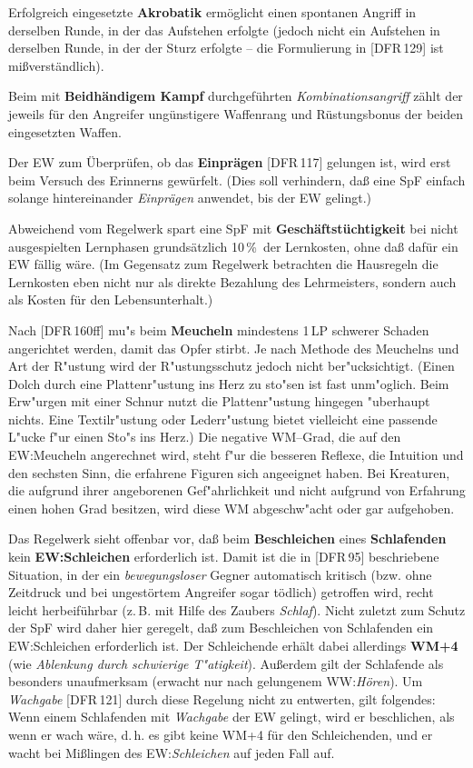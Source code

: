 \documentclass[10pt,a4paper,germanpar]{article}
\begin{document}
Erfolgreich eingesetzte \textbf{Akrobatik} ermöglicht einen spontanen
Angriff in derselben Runde, in der das Aufstehen erfolgte (jedoch
nicht ein Aufstehen in derselben Runde, in der der Sturz erfolgte --
die Formulierung in [DFR\,129] ist mißverständlich).

Beim mit \textbf{Beidhändigem Kampf} durchgeführten
\emph{Kombinationsangriff} zählt der jeweils für den Angreifer
ungünstigere Waffenrang und Rüstungsbonus der beiden eingesetzten
Waffen.

Der EW zum Überprüfen, ob das \textbf{Einprägen} [DFR\,117] gelungen
ist, wird erst beim Versuch des Erinnerns gewürfelt. (Dies soll
verhindern, daß eine SpF einfach solange hintereinander
\emph{Einprägen} anwendet, bis der EW gelingt.)

Abweichend vom Regelwerk spart eine SpF mit
\textbf{Geschäftstüchtigkeit} bei nicht ausgespielten Lernphasen
grund\-sätz\-lich 10\,\%\ der Lernkosten, ohne daß dafür ein EW fällig
wäre. (Im Gegensatz zum Regelwerk betrachten die Hausregeln die
Lernkosten eben nicht nur als direkte Bezahlung des Lehrmeisters,
sondern auch als Kosten für den Lebensunterhalt.)

Nach [DFR\,160ff] mu"s beim \textbf{Meucheln} mindestens 1\,LP
schwerer Schaden angerichtet werden, damit das Opfer stirbt. Je nach
Methode des Meuchelns und Art der R"ustung wird der R"ustungsschutz
jedoch nicht ber"ucksichtigt. (Einen Dolch durch eine Plattenr"ustung
ins Herz zu sto"sen ist fast unm"oglich. Beim Erw"urgen mit einer
Schnur nutzt die Plattenr"ustung hingegen "uberhaupt nichts. Eine
Textilr"ustung oder Lederr"ustung bietet vielleicht eine passende
L"ucke f"ur einen Sto"s ins Herz.) Die negative WM--Grad, die auf den
EW:Meucheln angerechnet wird, steht f"ur die besseren Reflexe, die
Intuition und den sechsten Sinn, die erfahrene Figuren sich angeeignet
haben. Bei Kreaturen, die aufgrund ihrer angeborenen Gef"ahrlichkeit
und nicht aufgrund von Erfahrung einen hohen Grad besitzen, wird diese
WM abgeschw"acht oder gar aufgehoben.

Das Regelwerk sieht offenbar vor, daß beim \textbf{Beschleichen} eines
\textbf{Schlafenden} kein \textbf{EW:Schleichen} erforderlich
ist. Damit ist die in [DFR\,95] beschriebene Situation, in der ein
\emph{bewegungsloser} Gegner automatisch kritisch (bzw. ohne Zeitdruck
und bei ungestörtem Angreifer sogar tödlich) getroffen wird, recht
leicht herbeiführbar (z.\,B. mit Hilfe des Zaubers
\emph{Schlaf}). Nicht zuletzt zum Schutz der SpF wird daher hier
geregelt, daß zum Beschleichen von Schlafenden ein EW:Schleichen
erforderlich ist. Der Schleichende erhält dabei allerdings
\textbf{WM+4} (wie \emph{Ablenkung durch schwierige
  T"atigkeit}). Außerdem gilt der Schlafende als besonders
unaufmerksam (erwacht nur nach gelungenem WW:\emph{Hören}). Um
\emph{Wachgabe} [DFR\,121] durch diese Regelung nicht zu entwerten,
gilt folgendes: Wenn einem Schlafenden mit \emph{Wachgabe} der EW
gelingt, wird er beschlichen, als wenn er wach wäre, d.\,h. es gibt
keine WM+4 für den Schleichenden, und er wacht bei Mißlingen des
EW:\emph{Schleichen} auf jeden Fall auf.
\end{document}
